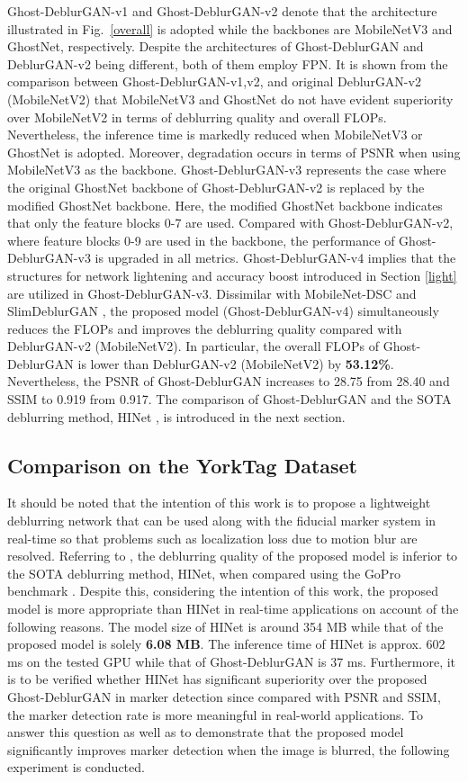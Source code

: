 \documentclass[letterpaper, 10 pt, conference]{ieeeconf}
\begin{document}
Ghost-DeblurGAN-v1 and Ghost-DeblurGAN-v2 denote that the architecture illustrated in Fig.~\ref{overall} is adopted while the backbones are MobileNetV3 and GhostNet, respectively.  Despite the architectures of Ghost-DeblurGAN and DeblurGAN-v2 being different, both of them employ FPN. It is shown from the comparison between Ghost-DeblurGAN-v1,v2, and original DeblurGAN-v2 (MobileNetV2) that MobileNetV3 and GhostNet do not have evident superiority over MobileNetV2 in terms of deblurring quality and overall FLOPs. Nevertheless, the inference time is markedly reduced when MobileNetV3 or GhostNet is adopted. Moreover, degradation occurs in terms of PSNR when using MobileNetV3 as the backbone. Ghost-DeblurGAN-v3 represents the case where the original GhostNet backbone of  Ghost-DeblurGAN-v2 is replaced by the modified GhostNet backbone. Here, the modified  GhostNet backbone indicates that only the feature blocks 0-7 are used. Compared with Ghost-DeblurGAN-v2, where feature blocks 0-9 are used in the backbone, the performance of Ghost-DeblurGAN-v3 is upgraded in all metrics. Ghost-DeblurGAN-v4 implies that the structures for network lightening and accuracy boost introduced in Section \ref{light} are utilized in Ghost-DeblurGAN-v3. Dissimilar with MobileNet-DSC \cite{deblurgan2} and SlimDeblurGAN \cite{truong2020slimdeblurgan}, the proposed model (Ghost-DeblurGAN-v4) simultaneously reduces the FLOPs and improves the deblurring quality compared with DeblurGAN-v2 (MobileNetV2). In particular, the overall FLOPs of Ghost-DeblurGAN is lower than DeblurGAN-v2 (MobileNetV2) by \textbf{53.12\%}. Nevertheless, the PSNR of Ghost-DeblurGAN increases to 28.75 from 28.40 and SSIM to 0.919 from 0.917. The comparison of Ghost-DeblurGAN and the SOTA deblurring method, HINet \cite{chen2021hinet}, is introduced in the next section.


\subsection{Comparison on the YorkTag Dataset}
It should be noted that the intention of this work is to propose a lightweight deblurring network that can be used along with the fiducial marker system in real-time so that problems such as localization loss due to motion blur are resolved. Referring to \cite{chen2021hinet}, the deblurring quality of the proposed model is inferior to the SOTA deblurring method, HINet, when compared using the GoPro benchmark \cite{nah}. Despite this, considering the intention of this work, the proposed model is more appropriate than HINet \cite{chen2021hinet} in real-time applications on account of the following reasons. The model size of HINet is around 354 MB while that of the proposed model is solely \textbf{6.08 MB}. The inference time of HINet is approx. 602 ms on the tested GPU while that of Ghost-DeblurGAN is 37 ms. Furthermore, it is to be verified whether HINet has significant superiority over the proposed Ghost-DeblurGAN in marker detection since compared with PSNR and SSIM, the marker detection rate is more meaningful in real-world applications. To answer this question as well as to demonstrate that the proposed model significantly improves marker detection when the image is blurred, the following experiment is conducted.
\end{document}
